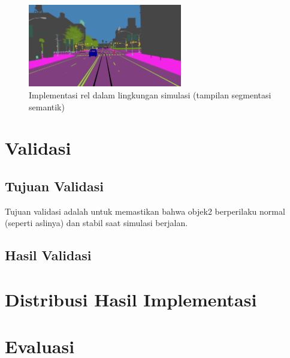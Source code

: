 \begin{figure}[!h]
    \centering
    \includegraphics[width=0.6\textwidth]{resources/chapter-4/rel-segmentation-camera.png}
    \caption{Implementasi rel dalam lingkungan simulasi (tampilan segmentasi semantik)}
    \label{fig:rel-2}
\end{figure}

\section{Validasi}

\subsection{Tujuan Validasi}

Tujuan validasi adalah untuk memastikan bahwa objek2 berperilaku normal (seperti
aslinya) dan stabil saat simulasi berjalan.


\subsection{Hasil Validasi}

\section{Distribusi Hasil Implementasi}

\section{Evaluasi}
